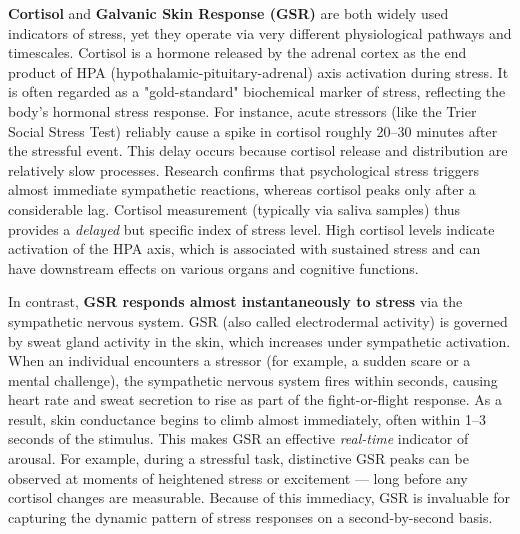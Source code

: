 \textbf{Cortisol} and \textbf{Galvanic Skin Response (GSR)} are both widely used indicators of stress, yet they operate via very different physiological pathways and timescales. Cortisol is a hormone released by the adrenal cortex as the end product of HPA (hypothalamic-pituitary-adrenal) axis activation during stress. It is often regarded as a "gold-standard" biochemical marker of stress, reflecting the body's hormonal stress response. For instance, acute stressors (like the Trier Social Stress Test) reliably cause a spike in cortisol roughly 20–30 minutes after the stressful event\cite{CortisolStressIndicator2020}. This delay occurs because cortisol release and distribution are relatively slow processes. Research confirms that psychological stress triggers almost immediate sympathetic reactions, whereas cortisol peaks only after a considerable lag\cite{CortisolStressIndicator2020}. Cortisol measurement (typically via saliva samples) thus provides a \textit{delayed} but specific index of stress level. High cortisol levels indicate activation of the HPA axis, which is associated with sustained stress and can have downstream effects on various organs and cognitive functions.

In contrast, \textbf{GSR responds almost instantaneously to stress} via the sympathetic nervous system. GSR (also called electrodermal activity) is governed by sweat gland activity in the skin, which increases under sympathetic activation. When an individual encounters a stressor (for example, a sudden scare or a mental challenge), the sympathetic nervous system fires within seconds, causing heart rate and sweat secretion to rise as part of the fight-or-flight response\cite{CortisolStressIndicator2020}. As a result, skin conductance begins to climb almost immediately, often within 1–3 seconds of the stimulus\cite{ElectrodermalActivityWiki}. This makes GSR an effective \textit{real-time} indicator of arousal. For example, during a stressful task, distinctive GSR peaks can be observed at moments of heightened stress or excitement — long before any cortisol changes are measurable\cite{CortisolStressIndicator2020}. Because of this immediacy, GSR is invaluable for capturing the dynamic pattern of stress responses on a second-by-second basis.

